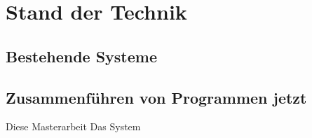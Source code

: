 \chapter{Stand der Technik}
\label{StandDerTechnik}
	\section{Bestehende Systeme}
	\label{StandDerTechnik:Sub1}
	
	\section{Zusammenführen von Programmen jetzt}
	\label{StandDerTechnik:Sub2}
	Diese Masterarbeit 
	Das System \cite{Laura}